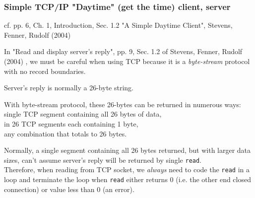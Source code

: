 \documentclass[10pt]{amsart}
\begin{document}
\begin{multicols*}{2}

\subsubsection{Simple TCP/IP "Daytime" (get the time) client, server}

cf. pp. 6, Ch. 1, Introduction, Sec. 1.2 "A Simple Daytime Client", Stevens, Fenner, Rudolf (2004) \cite{SFR2004}

In "Read and display server's reply", pp. 9, Sec. 1.2 of Stevens, Fenner, Rudolf (2004) \cite{SFR2004}, we must be careful when using TCP because it is a \emph{byte-stream} protocol with no record boundaries. 

Server's reply is normally a 26-byte string.

With byte-stream protocol, these 26-bytes can be returned in numerous ways: \\
single TCP segment containing all 26 bytes of data, \\
in 26 TCP segments each containing 1 byte, \\
any combination that totals to 26 bytes.

Normally, a single segment containing all 26 bytes returned, but with larger data sizes, can't assume server's reply will be returned by single \verb|read|. \\
Therefore, when reading from TCP socket, we \emph{always} need to code the \verb|read| in a loop and terminate the loop when \verb|read| either returns 0 (i.e. the other end closed connection) or value less than 0 (an error).


\end{multicols*}
\end{document}
